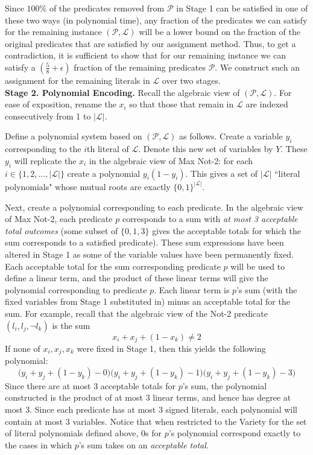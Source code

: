 \documentclass{article}
\begin{document}
Since $100\%$ of the predicates removed from $\mathcal{P}$ in Stage 1 can be satisfied in one of these two ways (in polynomial time), any fraction of the predicates we can satisfy for the remaining instance $(\mathcal{P}, \mathcal{L})$ will be a lower bound on the fraction of the original predicates that are satisfied by our assignment method. Thus, to get a contradiction, it is sufficient to show that for our remaining instance we can satisfy a $(\frac{5}{8}+\epsilon)$ fraction of the remaining predicates $\mathcal{P}$. We construct such an assignment for the remaining literals in $\mathcal{L}$ over two stages.\\


\noindent \textbf{Stage 2. Polynomial Encoding.} Recall the algebraic view of $(\mathcal{P}, \mathcal{L})$. For ease of exposition, rename the $x_i$ so that those that remain in $\mathcal{L}$ are indexed consecutively from 1 to $|\mathcal{L}|$.

Define a polynomial system based on $(\mathcal{P}, \mathcal{L})$ as follows. Create a variable $y_i$ corresponding to the $i$th literal of $\mathcal{L}$. Denote this new set of variables by $Y$. These $y_i$ will replicate the $x_i$ in the algebraic view of Max Not-2: for each $i\in \{1,2,...,|\mathcal{L}|\}$ create a polynomial $y_i(1-y_i)$. This gives a set of $|\mathcal{L}|$ ``literal polynomials" whose mutual roots are exactly $\{0,1\}^{|\mathcal{L}|}$. 

Next, create a polynomial corresponding to each predicate. In the algebraic view of Max Not-2, each predicate $p$ corresponds to a sum with \textit{at most 3 acceptable total outcomes} (some subset of $\{0,1,3\}$ gives the acceptable totals for which the sum corresponds to a satisfied predicate). These sum expressions have been altered in Stage 1 as some of the variable values have been permanently fixed. Each acceptable total for the sum corresponding predicate $p$ will be used to define a linear term, and the product of these linear terms will give the polynomial corresponding to predicate $p$. Each linear term is $p$'s sum (with the fixed variables from Stage 1 substituted in) minus an acceptable total for the sum. For example, recall that the algebraic view of the Not-2 predicate $(l_i,l_j,\neg l_k)$ is the sum
\[
x_i+x_j+(1-x_k)\neq 2
\]
If none of $x_i, x_j, x_k$ were fixed in Stage 1, then this yields the following polynomial:
\[
\Big(y_i+y_j+(1-y_k)-0\Big)\Big(y_i+y_j+(1-y_k)-1\Big)\Big(y_i+y_j+(1-y_k)-3\Big)
\]
Since there are at most 3 acceptable totals for $p$'s sum, the polynomial constructed is the product of at most 3 linear terms, and hence has degree at most 3. Since each predicate has at most 3 signed literals, each polynomial will contain at most 3 variables. Notice that when restricted to the Variety for the set of literal polynomials defined above, 0s for $p$'s polynomial correspond exactly to the cases in which $p$'s sum takes on an \textit{acceptable total}. 
\end{document}

